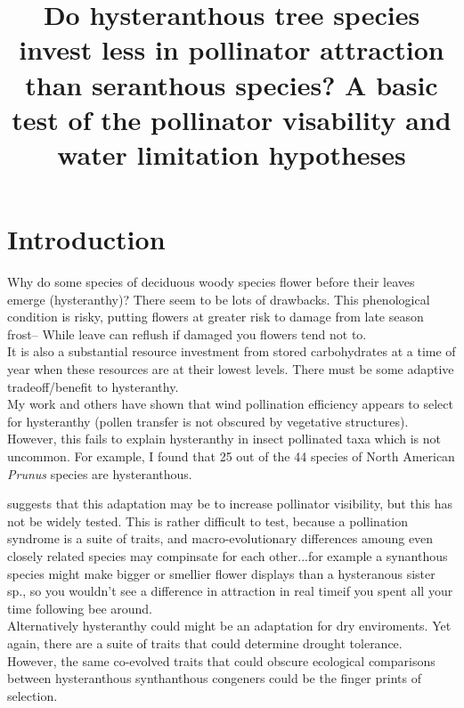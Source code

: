 \documentclass[12pt]{article}
\title{Do hysteranthous tree species invest less in pollinator attraction than seranthous species? A basic test of the pollinator visability and water limitation hypotheses}
\begin{document}
\maketitle



\section{Introduction}
Why do some species of deciduous woody species flower before their leaves emerge (hysteranthy)? There seem to be lots of drawbacks. This phenological condition is risky, putting flowers at greater risk to damage from late season frost-- While leave can reflush if damaged you flowers tend not to.\\

It is also a substantial resource investment from stored carbohydrates at a time of year when these resources are at their lowest levels. There must be some adaptive tradeoff/benefit to hysteranthy.\\

My work and others have shown that wind pollination efficiency appears to select for hysteranthy (pollen transfer is not obscured by vegetative structures). However, this fails to explain hysteranthy in insect pollinated taxa which is not uncommon. For example, I found that 25 out of the 44 species of North American \emph{Prunus} species are hysteranthous.

\citet{Janzen1967} suggests that this adaptation may be to increase pollinator visibility, but this has not be widely tested. This is rather difficult to test, because a pollination syndrome is a suite of traits, and macro-evolutionary differences amoung even closely related species may compinsate for each other...for example a synanthous species might make bigger or smellier flower displays than a hysteranous sister sp., so you wouldn't see a difference in attraction in real timeif you spent all your time following bee around.\\

Alternatively hysteranthy could might be an adaptation for dry enviroments. Yet again, there are a suite of traits that could determine drought tolerance.\\ 

However, the same co-evolved traits that could obscure ecological comparisons between hysteranthous synthanthous congeners could be the finger prints of selection.\\
\end{document}

